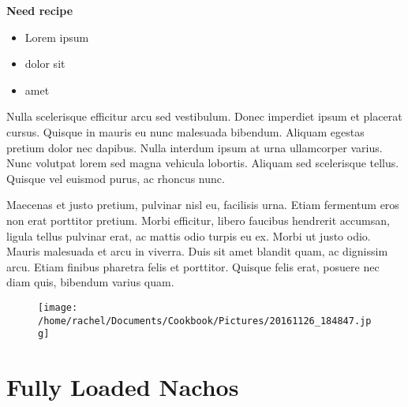 \documentclass{article}
\begin{document}
\textbf{Need recipe}
 
\vspace{5mm}
{\selectfont 
    \begin{itemize}[noitemsep]
    
      \item[] Lorem ipsum
      \item[] dolor sit
      \item[] amet
      
    \end{itemize}
    }
\vspace{5mm}
    
Nulla scelerisque efficitur arcu sed vestibulum. Donec imperdiet ipsum et placerat cursus. Quisque in mauris eu nunc malesuada bibendum. Aliquam egestas pretium dolor nec dapibus. Nulla interdum ipsum at urna ullamcorper varius. Nunc volutpat lorem sed magna vehicula lobortis. Aliquam sed scelerisque tellus. Quisque vel euismod purus, ac rhoncus nunc.

Maecenas et justo pretium, pulvinar nisl eu, facilisis urna. Etiam fermentum eros non erat porttitor pretium. Morbi efficitur, libero faucibus hendrerit accumsan, ligula tellus pulvinar erat, ac mattis odio turpis eu ex. Morbi ut justo odio. Mauris malesuada et arcu in viverra. Duis sit amet blandit quam, ac dignissim arcu. Etiam finibus pharetra felis et porttitor. Quisque felis erat, posuere nec diam quis, bibendum varius quam.

\restoregeometry







\newpage
\begin{figure}[]
\texttt{[image: /home/rachel/Documents/Cookbook/Pictures/20161126\_184847.jpg]}
\end{figure}
\restoregeometry
\clearpage
\newpage
{}



\section*{ \fontsize{25}{15}\selectfont Fully Loaded Nachos}
\end{document}
